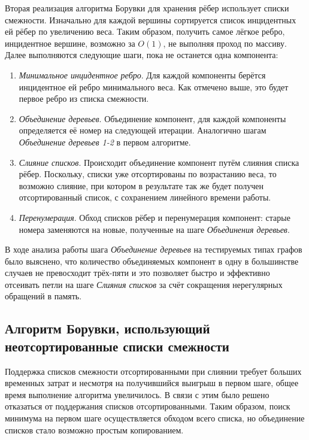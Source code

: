 \documentclass{article}
\begin{document}
Вторая реализация алгоритма Борувки для хранения рёбер использует списки смежности. 
Изначально для каждой вершины сортируется список инцидентных ей рёбер по увеличению веса. 
Таким образом, получить самое лёгкое ребро, инцидентное вершине, возможно за $O(1)$, не выполняя проход по массиву.
Далее выполняются следующие шаги, пока не останется одна компонента:
\begin{enumerate}
    \item \textit{Минимальное инцидентное ребро}.
        Для каждой компоненты берётся инцидентное ей ребро минимального веса. Как отмечено выше, это будет первое ребро из списка смежности.
    \item \textit{Объединение деревьев}.
        Объединение компонент, для каждой компоненты определяется её номер на следующей итерации. 
        Аналогично шагам \textit{Объединение деревьев 1-2} в первом алгоритме.
    \item \textit{Слияние списков}.
        Происходит объединение компонент путём слияния списка рёбер. 
        Поскольку, списки уже отсортированы по возрастанию веса, то возможно слияние, при котором в результате так же будет получен отсортированный список, с сохранением линейного времени работы.
    \item \textit{Перенумерация}.
        Обход списков рёбер и перенумерация компонент: старые номера заменяются на новые, полученные на шаге \textit{Объединения деревьев}.
\end{enumerate}

В ходе анализа работы шага \textit{Объединение деревьев} на тестируемых типах графов было выяснено, что количество объединяемых компонент в одну в большинстве случаев не превосходит трёх-пяти и это позволяет быстро и эффективно отсеивать петли на шаге \textit{Слияния списков} за счёт сокращения нерегулярных обращений в память.


\subsection{Алгоритм Борувки, использующий неотсортированные списки смежности}

Поддержка списков смежности отсортированными при слиянии требует больших временных затрат и несмотря на получившийся выигрыш в первом шаге, общее время выполнение алгоритма увеличилось.
В связи с этим было решено отказаться от поддержания списков отсортированными. Таким образом, поиск минимума на первом шаге осуществляется обходом всего списка, но объединение списков стало возможно простым копированием.
\end{document}
